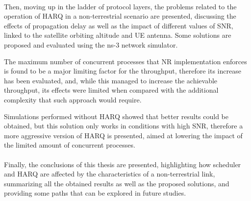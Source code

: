 \paragraph{}
Then, moving up in the ladder of protocol layers, the problems related to the operation of HARQ in a non-terrestrial scenario are presented, discussing the effects of propagation delay as well as the impact of different values of SNR, linked to the satellite orbiting altitude and \ac{UE} antenna. Some solutions are proposed and evaluated using the ns-3 network simulator.

The maximum number of concurrent processes that \ac{NR} implementation enforces is found to be a major limiting factor for the throughput, therefore its increase has been evaluated, and, while this managed to increase the achievable throughput, its effects were limited when compared with the additional complexity that such approach would require.

Simulations performed without HARQ showed that better results could be obtained, but this solution only works in conditions with high SNR, therefore a more aggressive version of HARQ is presented, aimed at lowering the impact of the limited amount of concurrent processes.

\paragraph{}
Finally, the conclusions of this thesis are presented, highlighting how scheduler and HARQ are affected by the characteristics of a non-terrestrial link, summarizing all the obtained results as well as the proposed solutions, and providing some paths that can be explored in future studies.